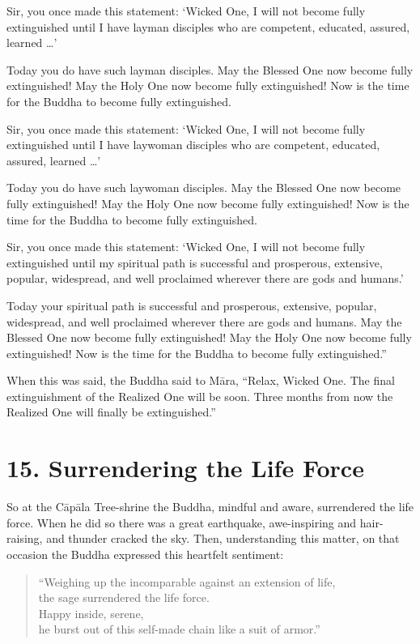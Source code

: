 \documentclass[12pt,openany]{book}%
\begin{document}
Sir, you once made this statement: ‘Wicked One, I will not become fully extinguished until I have layman disciples who are competent, educated, assured, learned …’ 

Today you do have such layman disciples. May the Blessed One now become fully extinguished! May the Holy One now become fully extinguished! Now is the time for the Buddha to become fully extinguished. 

Sir, you once made this statement: ‘Wicked One, I will not become fully extinguished until I have laywoman disciples who are competent, educated, assured, learned …’ 

Today you do have such laywoman disciples. May the Blessed One now become fully extinguished! May the Holy One now become fully extinguished! Now is the time for the Buddha to become fully extinguished. 

Sir, you once made this statement: ‘Wicked One, I will not become fully extinguished until my spiritual path is successful and prosperous, extensive, popular, widespread, and well proclaimed wherever there are gods and humans.’ 

Today your spiritual path is successful and prosperous, extensive, popular, widespread, and well proclaimed wherever there are gods and humans. May the Blessed One now become fully extinguished! May the Holy One now become fully extinguished! Now is the time for the Buddha to become fully extinguished.” 

When this was said, the Buddha said to \textsanskrit{Māra}, “Relax, Wicked One. The final extinguishment of the Realized One will be soon. Three months from now the Realized One will finally be extinguished.” 

\section*{15. Surrendering the Life Force }

So at the \textsanskrit{Cāpāla} Tree-shrine the Buddha, mindful and aware, surrendered the life force. When he did so there was a great earthquake, awe-inspiring and hair-raising, and thunder cracked the sky. Then, understanding this matter, on that occasion the Buddha expressed this heartfelt sentiment: 

\begin{verse}%
“Weighing up the incomparable against an extension of life, \\
the sage surrendered the life force. \\
Happy inside, serene, \\
he burst out of this self-made chain like a suit of armor.” 

%
\end{verse}
\end{document}
